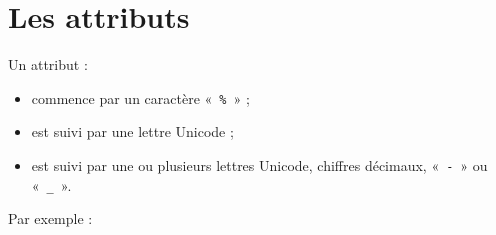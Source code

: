 \section{Les attributs}

Un attribut :
\begin{itemize}
  \item commence par un caractère «~\texttt{\%}~» ;
  \item est suivi par une lettre Unicode ;
  \item est suivi par une ou plusieurs lettres Unicode, chiffres décimaux, «~\texttt{-}~» ou «~\texttt{\_}~».
\end{itemize}

Par exemple :
\begin{galgas}
\end{galgas}


